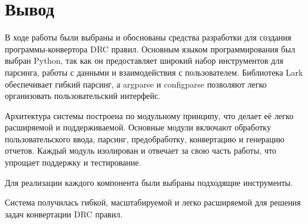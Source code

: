 \clearpage

\section*{\LARGE Вывод}

В ходе работы были выбраны и обоснованы средства разработки
для создания программы-конвертора DRC правил.
Основным языком программирования был выбран Python,
так как он предоставляет широкий набор инструментов для парсинга,
работы с данными и взаимодействия с пользователем.
Библиотека Lark обеспечивает гибкий парсинг,
а argparse и configparse позволяют легко организовать
пользовательский интерфейс.\par
Архитектура системы построена по модульному принципу,
что делает её легко расширяемой и поддерживаемой.
Основные модули включают обработку пользовательского ввода, парсинг, предобработку, конвертацию и генерацию отчетов.
Каждый модуль изолирован и отвечает за свою часть работы,
что упрощает поддержку и тестирование.\par
Для реализации каждого компонента были выбраны подходящие инструменты.\par
Система получилась гибкой, масштабируемой
и легко расширяемой для решения задач конвертации DRC правил.


